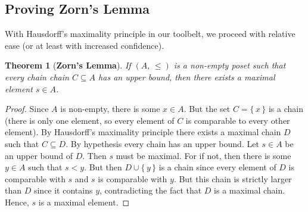 \documentclass{article}
\newtheorem{theorem}{Theorem}[section]
\theoremstyle{definition}
\begin{document}
        \subsection{Proving Zorn's Lemma}
            With Hausdorff's maximality principle in our toolbelt, we proceed
            with relative ease (or at least with increased confidence).
            \begin{theorem}[\textbf{Zorn's Lemma}]
                If $(A,\,\leq)$ is a non-empty poset such that every chain
                chain $C\subseteq{A}$ has an upper bound, then there exists
                a maximal element $s\in{A}$.
            \end{theorem}
            \begin{proof}
                Since $A$ is non-empty, there is some $x\in{A}$. But the set
                $C=\{\,x\,\}$ is a chain (there is only one element, so every
                element of $C$ is comparable to every other element). By
                Hausdorff's maximality principle there exists a maximal
                chain $D$ such that $C\subseteq{D}$. By
                hypethesis every chain has an upper bound. Let
                $s\in{A}$ be an upper bound of $D$. Then $s$ must be
                maximal. For if not, then there is some $y\in{A}$ such that
                $s<y$. But then $D\cup\{\,y\,\}$ is a chain since
                every element of $D$ is comparable with $s$ and $s$
                is comparable with $y$. But this chain is strictly larger than
                $D$ since it contains $y$, contradicting the fact
                that $D$ is a maximal chain. Hence, $s$ is a
                maximal element.
            \end{proof}
\end{document}
